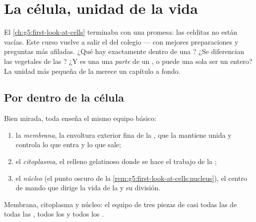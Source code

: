 \chapter{La célula, unidad de la vida}\label{ch:g6:cell-unit-of-life}

El \cref{ch:g5:first-look-at-cells} terminaba con una promesa: las
celditas no están vacías. Este curso vuelve a salir el  del
colegio --- con mejores preparaciones y preguntas más afiladas. ¿Qué
hay exactamente dentro de una ? ¿Se diferencian las 
vegetales de las ? ¿Y es una  una \emph{parte} de un , o puede una sola  ser un  entero? La unidad más
pequeña de la  merece un capítulo a fondo.

\section{Por dentro de la célula}

\begin{definition}\label{def:g6:cell-unit-of-life:parts}
Bien mirada, toda  enseña el mismo equipo básico:
\begin{enumerate}
  \item la \emph{membrana}, la envoltura exterior fina
        de la , que la mantiene unida y controla lo que entra y
        lo que sale;
  \item el \emph{citoplasma}, el relleno gelatinoso
        donde se hace el trabajo de la ;
  \item el \emph{núcleo} (el punto oscuro de la
        \cref{rem:g5:first-look-at-cells:nucleus}), el centro de mando
        que dirige la vida de la  y su división.
\end{enumerate}
Membrana, citoplasma y núcleo: el equipo de tres piezas de casi todas
las  de todas las , todos los  y todos los .
\end{definition}

